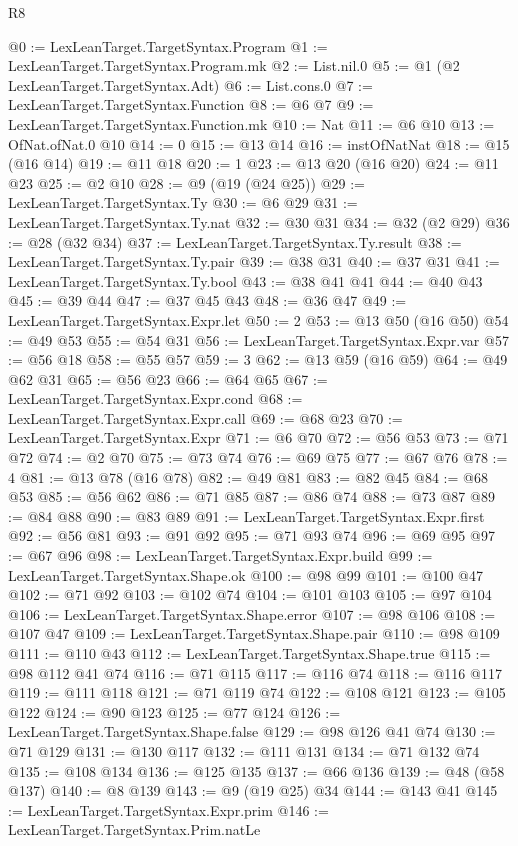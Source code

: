\begin{lexlean}{R8}
\begin{coremodule}
{{{{{{{{{{{{{{{{{{{{{{{@0 := LexLeanTarget.TargetSyntax.Program
@1 := LexLeanTarget.TargetSyntax.Program.mk
@2 := List.nil.{0}
@5 := @1 (@2 LexLeanTarget.TargetSyntax.Adt)
@6 := List.cons.{0}
@7 := LexLeanTarget.TargetSyntax.Function
@8 := @6 @7
@9 := LexLeanTarget.TargetSyntax.Function.mk
@10 := Nat
@11 := @6 @10
@13 := OfNat.ofNat.{0} @10
@14 := 0
@15 := @13 @14
@16 := instOfNatNat
@18 := @15 (@16 @14)
@19 := @11 @18
@20 := 1
@23 := @13 @20 (@16 @20)
@24 := @11 @23
@25 := @2 @10
@28 := @9 (@19 (@24 @25))
@29 := LexLeanTarget.TargetSyntax.Ty
@30 := @6 @29
@31 := LexLeanTarget.TargetSyntax.Ty.nat
@32 := @30 @31
@34 := @32 (@2 @29)
@36 := @28 (@32 @34)
@37 := LexLeanTarget.TargetSyntax.Ty.result
@38 := LexLeanTarget.TargetSyntax.Ty.pair
@39 := @38 @31
@40 := @37 @31
@41 := LexLeanTarget.TargetSyntax.Ty.bool
@43 := @38 @41 @41
@44 := @40 @43
@45 := @39 @44
@47 := @37 @45 @43
@48 := @36 @47
@49 := LexLeanTarget.TargetSyntax.Expr.let
@50 := 2
@53 := @13 @50 (@16 @50)
@54 := @49 @53
@55 := @54 @31
@56 := LexLeanTarget.TargetSyntax.Expr.var
@57 := @56 @18
@58 := @55 @57
@59 := 3
@62 := @13 @59 (@16 @59)
@64 := @49 @62 @31
@65 := @56 @23
@66 := @64 @65
@67 := LexLeanTarget.TargetSyntax.Expr.cond
@68 := LexLeanTarget.TargetSyntax.Expr.call
@69 := @68 @23
@70 := LexLeanTarget.TargetSyntax.Expr
@71 := @6 @70
@72 := @56 @53
@73 := @71 @72
@74 := @2 @70
@75 := @73 @74
@76 := @69 @75
@77 := @67 @76
@78 := 4
@81 := @13 @78 (@16 @78)
@82 := @49 @81
@83 := @82 @45
@84 := @68 @53
@85 := @56 @62
@86 := @71 @85
@87 := @86 @74
@88 := @73 @87
@89 := @84 @88
@90 := @83 @89
@91 := LexLeanTarget.TargetSyntax.Expr.first
@92 := @56 @81
@93 := @91 @92
@95 := @71 @93 @74
@96 := @69 @95
@97 := @67 @96
@98 := LexLeanTarget.TargetSyntax.Expr.build
@99 := LexLeanTarget.TargetSyntax.Shape.ok
@100 := @98 @99
@101 := @100 @47
@102 := @71 @92
@103 := @102 @74
@104 := @101 @103
@105 := @97 @104
@106 := LexLeanTarget.TargetSyntax.Shape.error
@107 := @98 @106
@108 := @107 @47
@109 := LexLeanTarget.TargetSyntax.Shape.pair
@110 := @98 @109
@111 := @110 @43
@112 := LexLeanTarget.TargetSyntax.Shape.true
@115 := @98 @112 @41 @74
@116 := @71 @115
@117 := @116 @74
@118 := @116 @117
@119 := @111 @118
@121 := @71 @119 @74
@122 := @108 @121
@123 := @105 @122
@124 := @90 @123
@125 := @77 @124
@126 := LexLeanTarget.TargetSyntax.Shape.false
@129 := @98 @126 @41 @74
@130 := @71 @129
@131 := @130 @117
@132 := @111 @131
@134 := @71 @132 @74
@135 := @108 @134
@136 := @125 @135
@137 := @66 @136
@139 := @48 (@58 @137)
@140 := @8 @139
@143 := @9 (@19 @25) @34
@144 := @143 @41
@145 := LexLeanTarget.TargetSyntax.Expr.prim
@146 := LexLeanTarget.TargetSyntax.Prim.natLe
}}}}}}}}}}}}}}}}}}}}}}}
\end{coremodule}
\end{lexlean}
